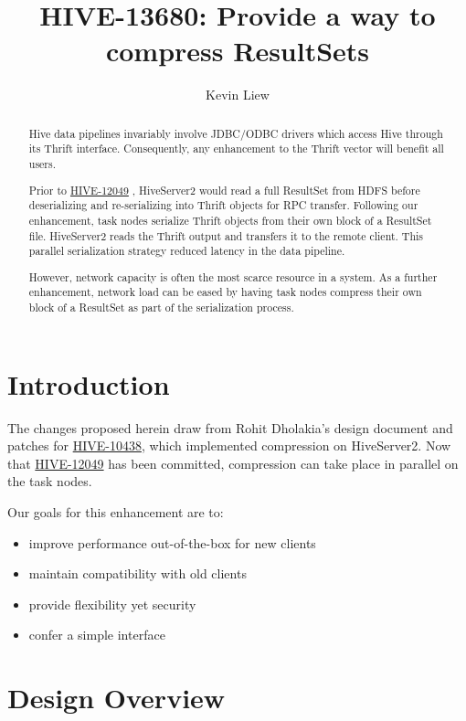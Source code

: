 \documentclass[11pt,a4paper]{article}
\title{HIVE-13680: Provide a way to compress ResultSets}
\author{Kevin Liew}
\begin{document}
\maketitle

\begin{abstract}
	Hive data pipelines invariably involve JDBC/ODBC drivers which access Hive through its Thrift interface. 
	Consequently, any enhancement to the Thrift vector will benefit all users.
	
	Prior to 
	\href{https://issues.apache.org/jira/browse/HIVE-12049}{HIVE-12049}
	, HiveServer2 would read a full ResultSet from HDFS before deserializing and re-serializing into Thrift objects for RPC transfer.
	Following our enhancement, task nodes serialize Thrift objects from their own block of a ResultSet file. 
	HiveServer2 reads the Thrift output and transfers it to the remote client. 
	This parallel serialization strategy reduced latency in the data pipeline.
	
	However, network capacity is often the most scarce resource in a system. 
	As a further enhancement, network load can be eased by having task nodes compress their own block of a ResultSet as part of the serialization process.
\end{abstract}

\section{Introduction}
	The changes proposed herein draw from Rohit Dholakia's design document and patches for
	\href{https://issues.apache.org/jira/browse/HIVE-10438}{HIVE-10438}, which implemented compression on HiveServer2.
	Now that
	\href{https://issues.apache.org/jira/browse/HIVE-12049}{HIVE-12049}
	has been committed, compression can take place in parallel on the task nodes.
	
	Our goals for this enhancement are to:
	\begin{itemize}
		\item improve performance out-of-the-box for new clients
		\item maintain compatibility with old clients
		\item provide flexibility yet security
		\item confer a simple interface
	\end{itemize}
	
\section{Design Overview}
\end{document}
